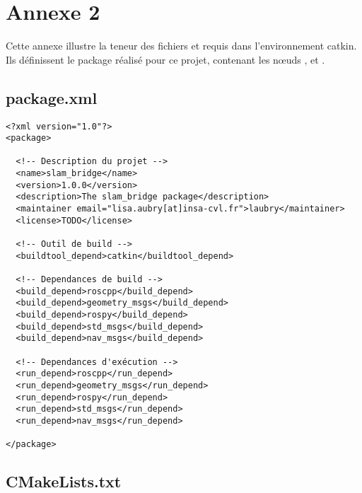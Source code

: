 \chapter*{Annexe 2}
\label{annexe:catkindocs}

\makeatletter
\renewcommand{\thesection}{\@arabic\c@section}
\makeatother

\setcounter{section}{0}

Cette annexe illustre la teneur des fichiers  et  requis dans l'environnement catkin.
Ils définissent le package  réalisé pour ce projet, contenant les n\oe{}uds ,  et . 

\section{package.xml}

\begin{lstlisting}[style=customcatkin]
<?xml version="1.0"?>
<package>

  <!-- Description du projet --> 
  <name>slam_bridge</name>
  <version>1.0.0</version>
  <description>The slam_bridge package</description>
  <maintainer email="lisa.aubry[at]insa-cvl.fr">laubry</maintainer>
  <license>TODO</license>
  
  <!-- Outil de build --> 
  <buildtool_depend>catkin</buildtool_depend>
  
  <!-- Dependances de build --> 
  <build_depend>roscpp</build_depend>
  <build_depend>geometry_msgs</build_depend>
  <build_depend>rospy</build_depend>
  <build_depend>std_msgs</build_depend>
  <build_depend>nav_msgs</build_depend>

  <!-- Dependances d'exécution -->
  <run_depend>roscpp</run_depend>
  <run_depend>geometry_msgs</run_depend>
  <run_depend>rospy</run_depend>
  <run_depend>std_msgs</run_depend>
  <run_depend>nav_msgs</run_depend>
  
</package>
\end{lstlisting}

\newpage 
\section{CMakeLists.txt}

